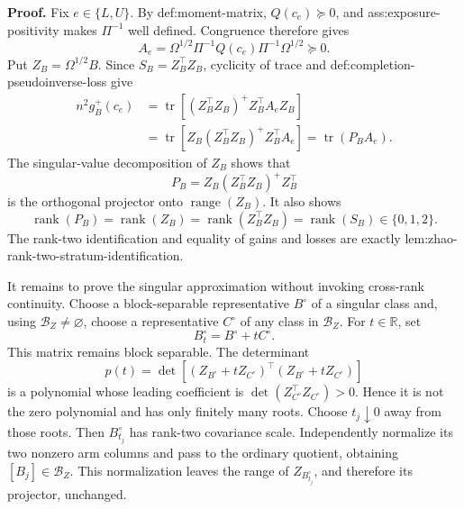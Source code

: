 \textbf{Proof.}
Fix \(e\in\{L,U\}\).  By def:moment-matrix, \(Q(c_e)\succeq0\), and ass:exposure-positivity makes \(\Pi^{-1}\) well defined.  Congruence therefore gives
\[
A_e=\Omega^{1/2}\Pi^{-1}Q(c_e)\Pi^{-1}\Omega^{1/2}\succeq0. \tag{1}
\]
Put \(Z_B=\Omega^{1/2}B\).  Since \(S_B=Z_B^{\top}Z_B\), cyclicity of trace and def:completion-pseudoinverse-loss give
\[
\begin{aligned}
n^2g_B^+(c_e)
&=\operatorname{tr}\!\left[(Z_B^{\top}Z_B)^+Z_B^{\top}A_eZ_B\right]\\
&=\operatorname{tr}\!\left[Z_B(Z_B^{\top}Z_B)^+Z_B^{\top}A_e\right]
=\operatorname{tr}(P_BA_e).                                      \tag{2}
\end{aligned}
\]
The singular-value decomposition of \(Z_B\) shows that
\[
P_B=Z_B(Z_B^{\top}Z_B)^+Z_B^{\top}
\]
is the orthogonal projector onto \(\operatorname{range}(Z_B)\).  It also shows
\[
\operatorname{rank}(P_B)=\operatorname{rank}(Z_B)
=\operatorname{rank}(Z_B^{\top}Z_B)
=\operatorname{rank}(S_B)\in\{0,1,2\}.                            \tag{3}
\]
The rank-two identification and equality of gains and losses are exactly lem:zhao-rank-two-stratum-identification.

It remains to prove the singular approximation without invoking cross-rank continuity.  Choose a block-separable representative \(B^{\circ}\) of a singular class and, using \(\mathcal B_Z\ne\varnothing\), choose a representative \(C^{\circ}\) of any class in \(\mathcal B_Z\).  For \(t\in\mathbb R\), set
\[
B_t^{\circ}=B^{\circ}+tC^{\circ}.
\]
This matrix remains block separable.  The determinant
\[
p(t)=\det\!\left[(Z_{B^{\circ}}+tZ_{C^{\circ}})^{\top}
(Z_{B^{\circ}}+tZ_{C^{\circ}})\right]
\]
is a polynomial whose leading coefficient is
\(\det(Z_{C^{\circ}}^{\top}Z_{C^{\circ}})>0\).  Hence it is not the zero polynomial and has only finitely many roots.  Choose \(t_j\downarrow0\) away from those roots.  Then \(B_{t_j}^{\circ}\) has rank-two covariance scale.  Independently normalize its two nonzero arm columns and pass to the ordinary quotient, obtaining \([B_j]\in\mathcal B_Z\).  This normalization leaves the range of \(Z_{B_{t_j}^{\circ}}\), and therefore its projector, unchanged.

